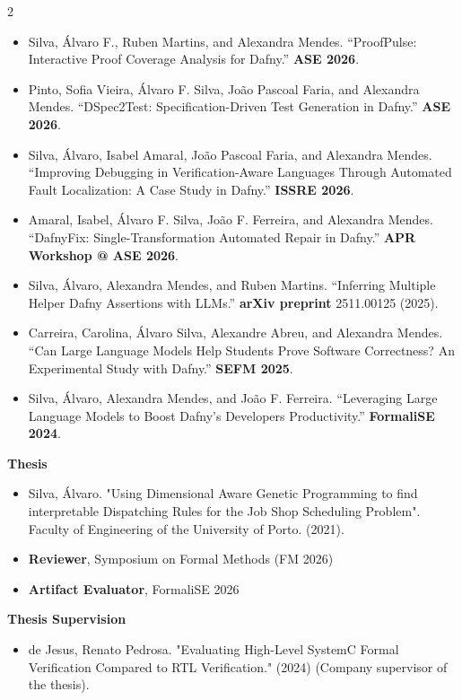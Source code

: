 \documentclass[10pt,a4paper,ragged2e,withhyper]{altacv}
\begin{document}
\begin{paracol}{2}
\begin{itemize}
\item
Silva, Álvaro F., Ruben Martins, and Alexandra Mendes. ``ProofPulse: Interactive Proof Coverage Analysis for Dafny.'' \textbf{ASE 2026}.
\item
Pinto, Sofia Vieira, Álvaro F. Silva, João Pascoal Faria, and Alexandra Mendes. ``DSpec2Test: Specification-Driven Test Generation in Dafny.'' \textbf{ASE 2026}.
\item
Silva, Álvaro, Isabel Amaral, João Pascoal Faria, and Alexandra Mendes. ``Improving Debugging in Verification-Aware Languages Through Automated Fault Localization: A Case Study in Dafny.'' \textbf{ISSRE 2026}.
\item
Amaral, Isabel, Álvaro F. Silva, João F. Ferreira, and Alexandra Mendes. ``DafnyFix: Single-Transformation Automated Repair in Dafny.'' \textbf{APR Workshop @ ASE 2026}.
\item
Silva, Álvaro, Alexandra Mendes, and Ruben Martins. ``Inferring Multiple Helper Dafny Assertions with LLMs.'' \textbf{arXiv preprint} 2511.00125 (2025).
\item
Carreira, Carolina, Álvaro Silva, Alexandre Abreu, and Alexandra Mendes. ``Can Large Language Models Help Students Prove Software Correctness? An Experimental Study with Dafny.'' \textbf{SEFM 2025}.
\item
Silva, Álvaro, Alexandra Mendes, and João F. Ferreira. ``Leveraging Large Language Models to Boost Dafny's Developers Productivity.'' \textbf{FormaliSE 2024}.
\end{itemize}

\textbf{Thesis}
\begin{itemize}
    \item Silva, Álvaro. "Using Dimensional Aware Genetic Programming to find interpretable Dispatching Rules for the Job Shop Scheduling Problem". Faculty of Engineering of the University of Porto. (2021).
\end{itemize}


\begin{itemize}
    \item \textbf{Reviewer}, Symposium on Formal Methods (FM 2026)
    \item \textbf{Artifact Evaluator}, FormaliSE 2026
\end{itemize}



\textbf{Thesis Supervision}
\begin{itemize}
\item
de Jesus, Renato Pedrosa. "Evaluating High-Level SystemC Formal Verification Compared to RTL Verification." (2024) (Company supervisor of the thesis).
\end{itemize}


\end{paracol}
\end{document}
